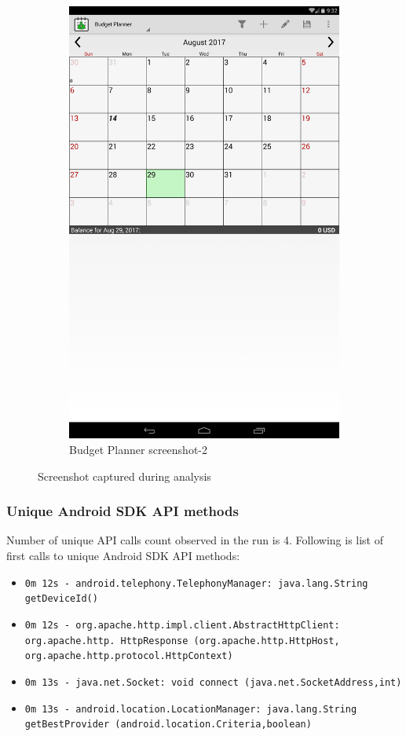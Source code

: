 \begin{figure}[h]
\begin{subfigure}[h]{0.45\textwidth}
		\includegraphics[width=\textwidth]{bp2.png}
		\caption{Budget Planner screenshot-2}
	\end{subfigure}
	\caption{Screenshot captured during analysis}
	\label{fig:bp1}
\end{figure}
\subsubsection{Unique Android SDK API methods}
Number of unique API calls count observed in the run is 4. Following is list of first calls to unique Android SDK API methods:
\begin{itemize}
    \item \texttt{0m 12s - android.telephony.TelephonyManager: java.lang.String getDeviceId()}
\item \texttt{0m 12s - org.apache.http.impl.client.AbstractHttpClient: org.apache.http. HttpResponse (org.apache.http.HttpHost, org.apache.http.protocol.HttpContext)}
\item \texttt{0m 13s - java.net.Socket: void connect (java.net.SocketAddress,int)}
 \item \texttt{0m 13s - android.location.LocationManager: java.lang.String getBestProvider (android.location.Criteria,boolean)}

\end{itemize}
